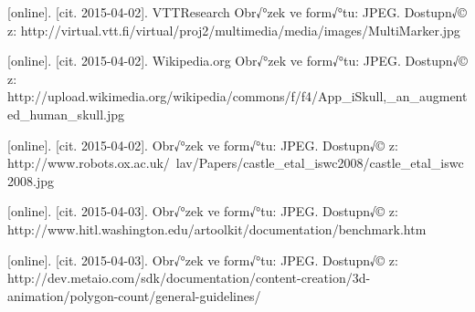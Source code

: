 \documentclass[twoside,12pt]{article}
\begin{document}
\begin{literatura}
{
	[online]. [cit. 2015-04-02]. VTTResearch
	Obr√°zek ve form√°tu: JPEG. Dostupn√© z: http://virtual.vtt.fi/virtual/proj2/multimedia/media/images/MultiMarker.jpg
}

{
	[online]. [cit. 2015-04-02]. Wikipedia.org
	Obr√°zek ve form√°tu: JPEG. Dostupn√© z: http://upload.wikimedia.org/wikipedia/commons/f/f4/App\_iSkull,\_an\_augmented\_human\_skull.jpg
}

{
	[online]. [cit. 2015-04-02]. 
	Obr√°zek ve form√°tu: JPEG. Dostupn√© z: http://www.robots.ox.ac.uk/~lav/Papers/castle\_etal\_iswc2008/castle\_etal\_iswc2008.jpg
}

{
	[online]. [cit. 2015-04-03]. 
	Obr√°zek ve form√°tu: JPEG. Dostupn√© z: http://www.hitl.washington.edu/artoolkit/documentation/benchmark.htm
}

{
	[online]. [cit. 2015-04-03]. 
	Obr√°zek ve form√°tu: JPEG. Dostupn√© z: http://dev.metaio.com/sdk/documentation/content-creation/3d-animation/polygon-count/general-guidelines/
}





%




\end{literatura}
\end{document}
